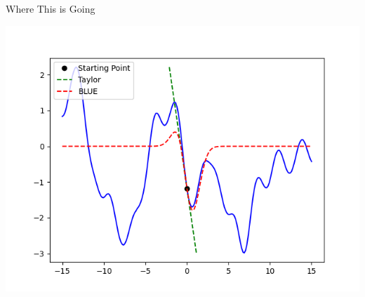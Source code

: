 \begin{frame}{Where This is Going}
	\begin{center}
		\includegraphics[scale=0.65]{graphics/BLUEvsTaylor3.png}
	\end{center}
\end{frame}